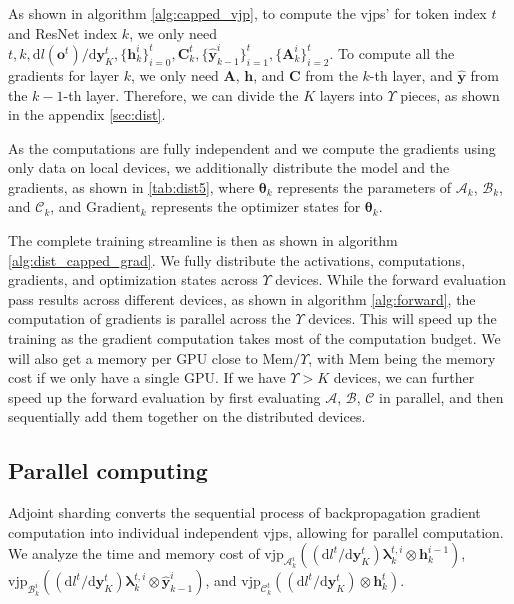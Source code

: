 \documentclass{article}
\newcommand{\A}{\mathcal{A}}
\newcommand{\B}{\mathcal{B}}
\newcommand{\C}{\mathcal{C}}
\newcommand{\vjp}{\mathrm{vjp}}
\newcommand{\diff}{\mathrm{d}}
\newcommand{\blambda}{\boldsymbol{\lambda}}
\begin{document}
As shown in algorithm \ref{alg:capped_vjp}, to compute the $\vjp$s' for token index $t$ and ResNet index $k$, we only need $t,k,\diff l(\mathbf{o}^t)/\diff \mathbf{y}_K^t, \{\mathbf{h}_k^i\}_{i=0}^t,\mathbf{C}_k^t, \{\hat{\mathbf{y}}_{k-1}^i\}_{i=1}^t,\{\mathbf{A}_k^i\}_{i=2}^t$. 
To compute all the gradients for layer $k$, we only need $\mathbf{A}$, $\mathbf{h}$, and $\mathbf{C}$ from the $k$-th layer, and $\hat{\mathbf{y}}$ from the $k-1$-th layer. 
Therefore, we can divide the $K$ layers into $\Upsilon$ pieces, as shown in the appendix \ref{sec:dist}.

As the computations are fully independent and we compute the gradients using only data on local devices, we additionally distribute the model and the gradients, as shown in \autoref{tab:dist5}, where $\boldsymbol{\theta}_k$ represents the parameters of $\A_k$, $\B_k$, and $\C_k$, and $\mathrm{Gradient}_k$ represents the optimizer states for $\boldsymbol{\theta}_k$.

The complete training streamline is then as shown in algorithm \ref{alg:dist_capped_grad}. We fully distribute the activations, computations, gradients, and optimization states across $\Upsilon$ devices. While the forward evaluation pass results across different devices, as shown in algorithm \ref{alg:forward}, the computation of gradients is parallel across the $\Upsilon$ devices. This will speed up the training as the gradient computation takes most of the computation budget. We will also get a memory per GPU close to $\mathrm{Mem}/\Upsilon$, with $\mathrm{Mem}$ being the memory cost if we only have a single GPU. If we have $\Upsilon > K$ devices, we can further speed up the forward evaluation by first evaluating $\A$, $\B$, $\C$ in parallel, and then sequentially add them together on the distributed devices.
 
\subsection{Parallel computing}
\label{sec:parallel}
Adjoint sharding converts the sequential process of backpropagation gradient computation into individual independent $\vjp$s, allowing for parallel computation. We analyze the time and memory cost of $\vjp_{\boldsymbol{\A}^i_k}((\diff l^t/\diff \mathbf{y}_K^t)\blambda^{t,i}_k\otimes \mathbf{h}^{i-1}_k)$, $\vjp_{\boldsymbol{\B}^i_k}((\diff l^t/\diff \mathbf{y}_K^t)\blambda^{t,i}_k\otimes \hat{\mathbf{y}}^i_{k-1})$, and $\vjp_{\boldsymbol{\C}^t_k}((\diff l^t/\diff \mathbf{y}_K^t)\otimes \mathbf{h}^t_k)$. 
\end{document}
